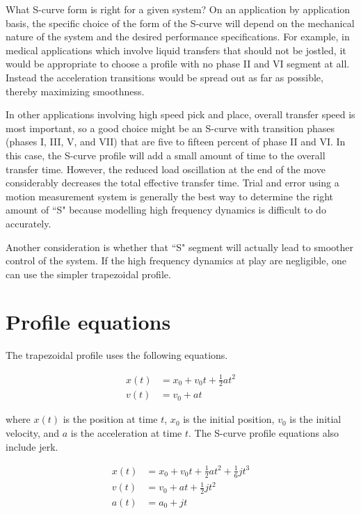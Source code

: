 What S-curve form is right for a given \gls{system}? On an application by
application basis, the specific choice of the form of the S-curve will depend on
the mechanical nature of the \gls{system} and the desired performance
specifications. For example, in medical applications which involve liquid
transfers that should not be jostled, it would be appropriate to choose a
profile with no phase II and VI segment at all. Instead the acceleration
transitions would be spread out as far as possible, thereby maximizing
smoothness.

In other applications involving high speed pick and place, overall transfer
speed is most important, so a good choice might be an S-curve with transition
phases (phases I, III, V, and VII) that are five to fifteen percent of phase II
and VI. In this case, the S-curve profile will add a small amount of time to the
overall transfer time. However, the reduced load oscillation at the end of the
move considerably decreases the total effective transfer time. Trial and error
using a motion measurement system is generally the best way to determine the
right amount of ``S" because modelling high frequency dynamics is difficult to
do accurately.

Another consideration is whether that ``S" segment will actually lead to
smoother control of the \gls{system}. If the high frequency dynamics at play are
negligible, one can use the simpler trapezoidal profile.

\section{Profile equations}

The trapezoidal profile uses the following equations.

\begin{align*}
  x(t) &= x_0 + v_0t + \frac{1}{2}at^2 \\
  v(t) &= v_0 + at
\end{align*}

where $x(t)$ is the position at time $t$, $x_0$ is the initial position, $v_0$
is the initial velocity, and $a$ is the acceleration at time $t$. The S-curve
profile equations also include jerk.

\begin{align*}
  x(t) &= x_0 + v_0t + \frac{1}{2}at^2 + \frac{1}{6}jt^3 \\
  v(t) &= v_0 + at + \frac{1}{2}jt^2 \\
  a(t) &= a_0 + jt
\end{align*}

